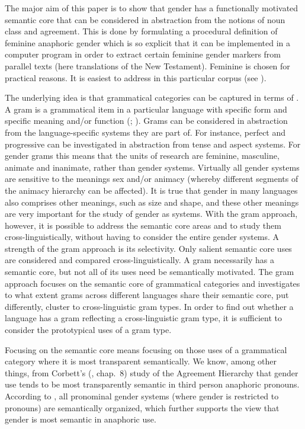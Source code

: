 \documentclass[output=collectionpaper]{langsci/langscibook}
\begin{document}
The major aim of this paper is to show that gender has a functionally motivated semantic core that can be considered in abstraction from the notions of noun class and agreement. This is done by formulating a procedural definition of feminine anaphoric gender which is so explicit that it can be implemented in a computer program in order to extract certain feminine gender markers from parallel texts (here translations of the New Testament). Feminine is chosen for practical reasons. It is easiest to address in this particular corpus (see ).

The underlying idea is that grammatical categories can be captured in terms of . A gram is a grammatical item in a particular language with specific form and specific meaning and/or function (\citealt{Bybee1989}; \citealt{Dahl2016}). Grams can be considered in abstraction from the language-specific systems they are part of. For instance, perfect and progressive can be investigated in abstraction from tense and aspect systems. For gender grams this means that the units of research are feminine, masculine, animate and inanimate, rather than gender systems. Virtually all gender systems are sensitive to the meanings sex and/or animacy (whereby different segments of the animacy hierarchy can be affected). It is true that gender in many languages also comprises other meanings, such as size and shape, and these other meanings are very important for the study of gender as systems. With the gram approach, however, it is possible to address the semantic core areas and to study them cross-linguistically, without having to consider the entire gender systems. A strength of the gram approach is its selectivity. Only salient semantic core uses are considered and compared cross-linguistically. A gram necessarily has a semantic core, but not all of its uses need be semantically motivated. The gram approach focuses on the semantic core of grammatical categories and investigates to what extent grams across different languages share their semantic core, put differently, cluster to cross-linguistic gram types. In order to find out whether a language has a gram reflecting a cross-linguistic gram type, it is sufficient to consider the prototypical uses of a gram type.

Focusing on the semantic core means focusing on those uses of a grammatical category where it is most transparent semantically. We know, among other things, from Corbett’s (\citeyear{Corbett1991}, chap.~8) study of the Agreement Hierarchy that gender use tends to be most transparently semantic in third person anaphoric pronouns. According to \citet{Audring2009a}, all pronominal gender systems (where gender is restricted to pronouns) are semantically organized, which further supports the view that gender is most semantic in anaphoric use.
\end{document}
